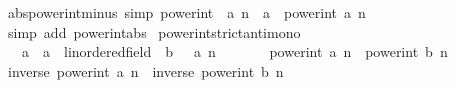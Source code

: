 \begin{isabellebody}
\endisatagproof
{\isafoldproof}%
%
\isadelimproof
\isanewline
%
\endisadelimproof
\isanewline
{}\isamarkupfalse%
\ abs{\isacharunderscore}{\kern0pt}power{\isacharunderscore}{\kern0pt}int{\isacharunderscore}{\kern0pt}minus\ {\isacharbrackleft}{\kern0pt}simp{\isacharbrackright}{\kern0pt}{\isacharcolon}{\kern0pt}\ {\isachardoublequoteopen}{\isasymbar}power{\isacharunderscore}{\kern0pt}int\ {\isacharparenleft}{\kern0pt}{\isacharminus}{\kern0pt}\ a{\isacharparenright}{\kern0pt}\ n\ {\isacharcolon}{\kern0pt}{\isacharcolon}{\kern0pt}\ {\isacharprime}{\kern0pt}a{\isasymbar}\ {\isacharequal}{\kern0pt}\ {\isasymbar}power{\isacharunderscore}{\kern0pt}int\ a\ n{\isasymbar}{\isachardoublequoteclose}\isanewline
%
\isadelimproof
\ \ %
\endisadelimproof
%
\isatagproof
{}\isamarkupfalse%
\ {\isacharparenleft}{\kern0pt}simp\ add{\isacharcolon}{\kern0pt}\ power{\isacharunderscore}{\kern0pt}int{\isacharunderscore}{\kern0pt}abs{\isacharparenright}{\kern0pt}%
\endisatagproof
{\isafoldproof}%
%
\isadelimproof
\isanewline
%
\endisadelimproof
\isanewline
{}\isamarkupfalse%
\ power{\isacharunderscore}{\kern0pt}int{\isacharunderscore}{\kern0pt}strict{\isacharunderscore}{\kern0pt}antimono{\isacharcolon}{\kern0pt}\isanewline
\ \ \ {\isachardoublequoteopen}{\isacharparenleft}{\kern0pt}a\ {\isacharcolon}{\kern0pt}{\isacharcolon}{\kern0pt}\ {\isacharprime}{\kern0pt}a\ {\isacharcolon}{\kern0pt}{\isacharcolon}{\kern0pt}\ linordered{\isacharunderscore}{\kern0pt}field{\isacharparenright}{\kern0pt}\ {\isacharless}{\kern0pt}\ b{\isachardoublequoteclose}\ {\isachardoublequoteopen}{}\ {\isacharless}{\kern0pt}\ a{\isachardoublequoteclose}\ {\isachardoublequoteopen}n\ {\isacharless}{\kern0pt}\ {}{\isachardoublequoteclose}\isanewline
\ \ \ \ \ {\isachardoublequoteopen}power{\isacharunderscore}{\kern0pt}int\ a\ n\ {\isachargreater}{\kern0pt}\ power{\isacharunderscore}{\kern0pt}int\ b\ n{\isachardoublequoteclose}\isanewline
%
\isadelimproof
%
\endisadelimproof
%
\isatagproof
{}\isamarkupfalse%
\ {\isacharminus}{\kern0pt}\isanewline
\ \ \isamarkupfalse%
\ {\isachardoublequoteopen}inverse\ {\isacharparenleft}{\kern0pt}power{\isacharunderscore}{\kern0pt}int\ a\ {\isacharparenleft}{\kern0pt}{\isacharminus}{\kern0pt}n{\isacharparenright}{\kern0pt}{\isacharparenright}{\kern0pt}\ {\isachargreater}{\kern0pt}\ inverse\ {\isacharparenleft}{\kern0pt}power{\isacharunderscore}{\kern0pt}int\ b\ {\isacharparenleft}{\kern0pt}{\isacharminus}{\kern0pt}n{\isacharparenright}{\kern0pt}{\isacharparenright}{\kern0pt}{\isachardoublequoteclose}\isanewline

\end{isabellebody}
